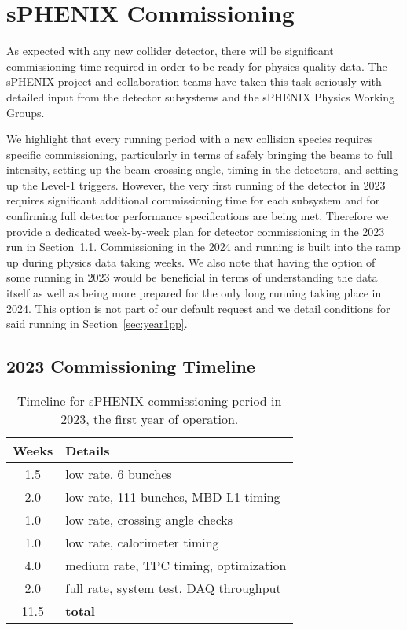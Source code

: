 \chapter{sPHENIX Commissioning}
\label{chap:commissioning}

As expected with any new collider detector, there will be significant
commissioning time required in order to be ready for physics quality
data.  The sPHENIX project and collaboration teams have taken this
task seriously with detailed input from the detector subsystems and
the sPHENIX Physics Working Groups.  

We highlight that every running period with a new collision species requires specific commissioning, particularly in terms of safely bringing the beams to full intensity, setting up the beam crossing angle, timing in the detectors, and setting up the Level-1 triggers.    However, the very first running of the detector in 2023 requires significant additional commissioning time for each subsystem and for confirming full detector performance specifications are being met.   Therefore we provide a dedicated week-by-week plan for detector commissioning in the 2023 \auau run in Section~\ref{sec:auaucomm}.    Commissioning in the 2024 \pp and \pau running is built into the ramp up during physics data taking weeks.   We also note that having the option of some \pp running in 2023 would be beneficial in terms of understanding the \auau data itself as well as being more prepared for the only long \pp running taking place in 2024.   This option is not part of our default request and we detail conditions for said running in Section~\ref{sec:year1pp}.

\section{2023 \auau Commissioning Timeline}
\label{sec:auaucomm}

\begin{table}[]
    \centering
    \begin{tabular}{|c|l|} \hline        
    Weeks &  Details \\ \hline
        1.5 & low rate, 6 bunches \\ 
        2.0 & low rate, 111 bunches, MBD L1 timing \\ 
        1.0 & low rate, crossing angle checks \\ 
        1.0 & low rate, calorimeter timing \\ 
        4.0 & medium rate, TPC timing, optimization \\
        2.0 & full rate, system test, DAQ throughput \\ \hline
        11.5 & {\bf total} \\ \hline
    \end{tabular}
    \caption{Timeline for sPHENIX commissioning
    period in 2023, the first year of operation.}
    \label{tab:commision}
\end{table}

